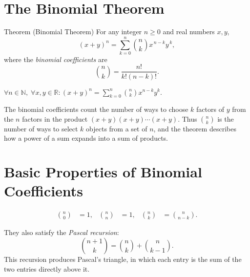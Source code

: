 
\section{The Binomial Theorem}
\label{sec:binomial-theorem}

\begin{theorembox}{Theorem (Binomial Theorem)}
For any integer \(n \ge 0\) and real numbers \(x,y\),
\[
(x+y)^n
=
\sum_{k=0}^{n} \binom{n}{k} x^{\,n-k} y^{\,k},
\]
where the \emph{binomial coefficients} are
\[
\binom{n}{k}
=
\frac{n!}{k!(n-k)!}.
\]
\end{theorembox}
\label{thm:binomial}

\begin{remark*}
\(\forall n \in \mathbb{N},\; \forall x,y \in \mathbb{R}: \displaystyle(x+y)^n = \sum_{k=0}^{n}\binom{n}{k}x^{n-k}y^{k}\).
\end{remark*}

\begin{remark*}
The binomial coefficients count the number of ways to choose \(k\) factors of
\(y\) from the \(n\) factors in the product \((x+y)(x+y)\cdots(x+y)\).
Thus \(\binom{n}{k}\) is the number of ways to select \(k\) objects from a
set of \(n\), and the theorem describes how a power of a sum expands into
a sum of products.
\end{remark*}

\section*{Basic Properties of Binomial Coefficients}

\begin{remark*}
\begin{align*}
\binom{n}{0} &= 1, &
\binom{n}{n} &= 1, &
\binom{n}{k} &= \binom{n}{n-k}.
\end{align*}

They also satisfy the \emph{Pascal recursion}:
\[
\binom{n+1}{k}
=
\binom{n}{k}+\binom{n}{k-1}.
\]
This recursion produces Pascal's triangle, in which each entry is the
sum of the two entries directly above it.
\end{remark*}

\begin{center}
\end{center}

